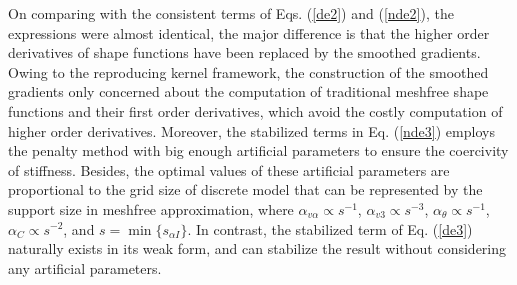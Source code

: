 On comparing with the consistent terms of Eqs. (\ref{de2}) and (\ref{nde2}), the expressions were almost identical, the major difference is that the higher order derivatives of shape functions have been replaced by the smoothed gradients. Owing to the reproducing kernel framework, the construction of the smoothed gradients only concerned about the computation of traditional meshfree shape functions and their first order derivatives, which avoid the costly computation of higher order derivatives. Moreover, the stabilized terms in Eq. (\ref{nde3}) employs the penalty method with big enough artificial parameters to ensure the coercivity of stiffness. Besides, the optimal values of these artificial parameters are proportional to the grid size of discrete model that can be represented by the support size in meshfree approximation, where $\alpha_{v\alpha} \propto s^{-1}$, $\alpha_{v3} \propto s^{-3}$, $\alpha_\theta \propto s^{-1}$, $\alpha_C \propto s^{-2}$\cite{benzaken2021}, and $s = \min\{s_{\alpha I}\}$. In contrast, the stabilized term of Eq. (\ref{de3}) naturally exists in its weak form, and can stabilize the result without considering any artificial parameters.
 
